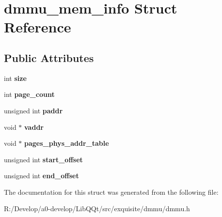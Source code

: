 \hypertarget{structdmmu__mem__info}{}\section{dmmu\+\_\+mem\+\_\+info Struct Reference}
\label{structdmmu__mem__info}
\subsection*{Public Attributes}
\begin{DoxyCompactItemize}
\item 
\mbox{\label{structdmmu__mem__info_a0e728503e9f66bcd17761a3293427a75}} 
int {\bfseries size}
\item 
\mbox{\label{structdmmu__mem__info_a76edda1e02f270dbe8ff074d1c7714e7}} 
int {\bfseries page\+\_\+count}
\item 
\mbox{\label{structdmmu__mem__info_a6d5bee1676be30dd434067644fe764a9}} 
unsigned int {\bfseries paddr}
\item 
\mbox{\label{structdmmu__mem__info_a775ffbacaf24eb74fe28e2137f2ebce5}} 
void $\ast$ {\bfseries vaddr}
\item 
\mbox{\label{structdmmu__mem__info_a35fdab643cbc5e8f616629e2e782e5f1}} 
void $\ast$ {\bfseries pages\+\_\+phys\+\_\+addr\+\_\+table}
\item 
\mbox{\label{structdmmu__mem__info_a60c199d45958a542c61dbd501da78405}} 
unsigned int {\bfseries start\+\_\+offset}
\item 
\mbox{\label{structdmmu__mem__info_a18f384e3317f246e0aa2bf63949d0f7f}} 
unsigned int {\bfseries end\+\_\+offset}
\end{DoxyCompactItemize}


The documentation for this struct was generated from the following file\+:\begin{DoxyCompactItemize}
\item 
R\+:/\+Develop/a0-\/develop/\+Lib\+Q\+Qt/src/exquisite/dmmu/dmmu.\+h\end{DoxyCompactItemize}
